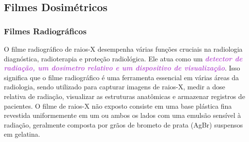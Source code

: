 \documentclass[11pt,a4paper]{article}
\begin{document}
\subsection*{Filmes Dosimétricos}

\subsubsection*{Filmes Radiográficos}

	O filme radiográfico de raios-X desempenha várias funções cruciais na radiologia diagnóstica, radioterapia e proteção radiológica. Ele atua como um \textcolor{MediumOrchid}{\textit{\textbf{detector de radiação, um dosímetro relativo e um dispositivo de visualização}}}. Isso significa que o filme radiográfico é uma ferramenta essencial em várias áreas da radiologia, sendo utilizado para capturar imagens de raios-X, medir a dose relativa de radiação, visualizar as estruturas anatômicas e armazenar registros de pacientes. O filme de raios-X não exposto consiste em uma base plástica fina revestida uniformemente em um ou ambos os lados com uma emulsão sensível à radiação, geralmente composta por grãos de brometo de prata (AgBr) suspensos em gelatina.
\end{document}
